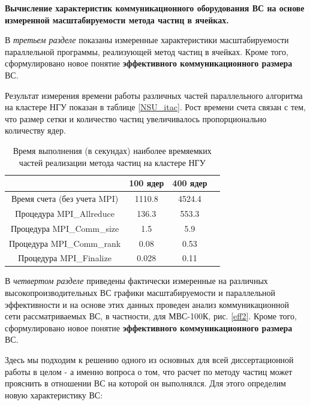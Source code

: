 \textbf{Вычисление характеристик коммуникационного оборудования ВС на основе измеренной масштабируемости метода частиц в ячейках.}

В \textit{третьем разделе} показаны измеренные характеристики масштабируемости параллельной программы, реализующей метод частиц в ячейках. Кроме того, сформулировано новое понятие \textbf{эффективного коммуникационного размера} ВС.

Результат измерения времени работы различных частей параллельного алгоритма на кластере НГУ показан в таблице \ref{NSU_itac}. Рост времени счета связан с тем, что размер сетки и количество частиц увеличивалось пропорционально количеству ядер.

\begin{table}[ht]
	\begin{center}
		\caption{Время выполнения (в секундах) наиболее времяемких частей реализации метода частиц на кластере НГУ}
		\begin{tabular}{|c|c|c|c|}
			\hline
			                              &  100 ядер    & 400 ядер \\ \hline
			Время счета (без учета MPI)   &  1110.8      & 4524.4   \\ \hline
			Процедура MPI\_Allreduce      &  136.3       & 553.3    \\ \hline
				Процедура MPI\_Comm\_size &  1.5         &  5.9    \\ \hline
				Процедура MPI\_Comm\_rank &  0.08        &  0.53            \\
				Процедура MPI\_Finalize   &  0.028        &  0.11  \\ \hline
				
		\end{tabular}
		\label{PerfGPU}
	\end{center}
\end{table}




	В \textit{четвертом разделе} приведены фактически измеренные на различных высокопроизводительных ВС графики масштабируемости и параллельной эффективности и на основе этих данных проведен анализ коммуникационной сети рассматриваемых ВС, в частности, для МВС-100К, рис. \ref{eff2}. Кроме того, сформулировано новое понятие \textbf{эффективного коммуникационного размера} ВС.
	

  
 
 
 Здесь мы подходим к решению одного из основных для всей диссертационной работы в целом - а именно вопроса о том, что расчет по методу частиц может прояснить в отношении ВС на которой он выполнялся. Для этого определим новую характеристику ВС:
 
